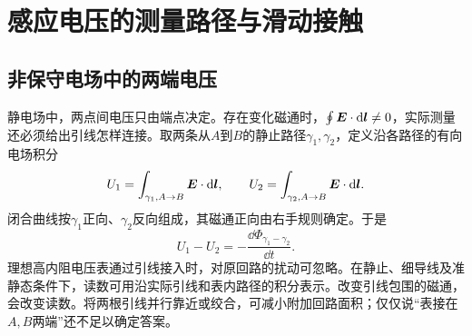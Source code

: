\section{感应电压的测量路径与滑动接触}
\subsection{非保守电场中的两端电压}
静电场中，两点间电压只由端点决定。存在变化磁通时，$\oint\bm{E}\cdot\mathop{}\!\mathrm d\bm{l}\ne0$，实际测量还必须给出引线怎样连接。取两条从$A$到$B$的静止路径$\gamma_1,\gamma_2$，定义沿各路径的有向电场积分
\[
 U_1=\int_{\gamma_1,A\to B}\bm{E}\cdot\mathop{}\!\mathrm d\bm{l},\qquad
 U_2=\int_{\gamma_2,A\to B}\bm{E}\cdot\mathop{}\!\mathrm d\bm{l}.
\]
闭合曲线按$\gamma_1$正向、$\gamma_2$反向组成，其磁通正向由右手规则确定。于是
\[
 U_1-U_2=-\frac{\dd\Phi_{\gamma_1-\gamma_2}}{\dd t}.
\]
理想高内阻电压表通过引线接入时，对原回路的扰动可忽略。在静止、细导线及准静态条件下，读数可用沿实际引线和表内路径的积分表示。改变引线包围的磁通，会改变读数。将两根引线并行靠近或绞合，可减小附加回路面积；仅仅说“表接在$A,B$两端”还不足以确定答案。

